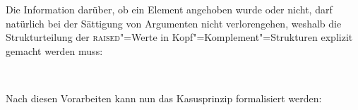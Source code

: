 {Die Information darüber, ob ein Element angehoben wurde oder nicht, darf natürlich
bei der Sättigung von Argumenten nicht verlorengehen, weshalb die Strukturteilung
der \textsc{raised}"=Werte in Kopf"=Komplement"=Strukturen explizit gemacht werden muss:
\begin{samepage}
\begin{schema}
\label{schema-bin-mark-final}
 \impl\\
\end{schema}
\end{samepage}
\largerpage[-2]

\noindent
Nach diesen Vorarbeiten kann nun das Kasusprinzip formalisiert werden:

}
